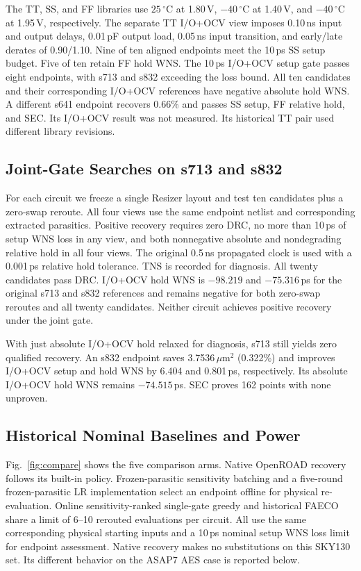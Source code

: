 \documentclass[journal]{IEEEtran}
\newcommand{\um}{\ensuremath{\mu\mathrm{m}^{2}}}
\begin{document}
The TT, SS, and FF libraries use \(25\,^\circ\mathrm{C}\) at 1.80\,V, \(-40\,^\circ\mathrm{C}\) at 1.40\,V, and \(-40\,^\circ\mathrm{C}\) at 1.95\,V, respectively. The separate TT I/O+OCV view imposes 0.10\,ns input and output delays, 0.01\,pF output load, 0.05\,ns input transition, and early/late derates of 0.90/1.10. Nine of ten aligned endpoints meet the 10\,ps SS setup budget. Five of ten retain FF hold WNS. The 10\,ps I/O+OCV setup gate passes eight endpoints, with s713 and s832 exceeding the loss bound. All ten candidates and their corresponding I/O+OCV references have negative absolute hold WNS. A different s641 endpoint recovers 0.66\% and passes SS setup, FF relative hold, and SEC. Its I/O+OCV result was not measured. Its historical TT pair used different library revisions.

\subsection{Joint-Gate Searches on s713 and s832}

For each circuit we freeze a single Resizer layout and test ten candidates plus a zero-swap reroute. All four views use the same endpoint netlist and corresponding extracted parasitics. Positive recovery requires zero DRC, no more than 10\,ps of setup WNS loss in any view, and both nonnegative absolute and nondegrading relative hold in all four views. The original 0.5\,ns propagated clock is used with a 0.001\,ps relative hold tolerance. TNS is recorded for diagnosis. All twenty candidates pass DRC. I/O+OCV hold WNS is \(-98.219\) and \(-75.316\)\,ps for the original s713 and s832 references and remains negative for both zero-swap reroutes and all twenty candidates. Neither circuit achieves positive recovery under the joint gate.

With just absolute I/O+OCV hold relaxed for diagnosis, s713 still yields zero qualified recovery. An s832 endpoint saves 3.7536\,\um{} (0.322\%) and improves I/O+OCV setup and hold WNS by 6.404 and 0.801\,ps, respectively. Its absolute I/O+OCV hold WNS remains \(-74.515\)\,ps. SEC proves 162 points with none unproven.

\subsection{Historical Nominal Baselines and Power}

Fig.~\ref{fig:compare} shows the five comparison arms. Native OpenROAD recovery follows its built-in policy. Frozen-parasitic sensitivity batching and a five-round frozen-parasitic LR implementation select an endpoint offline for physical re-evaluation. Online sensitivity-ranked single-gate greedy and historical FAECO share a limit of 6--10 rerouted evaluations per circuit. All use the same corresponding physical starting inputs and a 10\,ps nominal setup WNS loss limit for endpoint assessment. Native recovery makes no substitutions on this SKY130 set. Its different behavior on the ASAP7 AES case is reported below.
\end{document}
